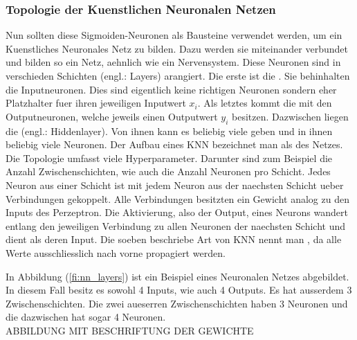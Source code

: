 \documentclass[../main]{subfiles}
\begin{document}
\subsubsection{Topologie der Kuenstlichen Neuronalen Netzen}
Nun sollten diese Sigmoiden-Neuronen als Bausteine verwendet werden, um ein Kuenstliches
Neuronales Netz zu bilden. Dazu werden sie miteinander verbundet und bilden so ein Netz,
aehnlich wie ein Nervensystem.
Diese Neuronen sind in verschieden Schichten (engl.: Layers)
arangiert. Die erste ist die . Sie behinhalten die
Inputneuronen. Dies sind eigentlich keine richtigen
Neuronen sondern eher Platzhalter fuer ihren jeweiligen Inputwert $x_i$. Als letztes kommt die
 mit den Outputneuronen, welche jeweils einen Outputwert $y_i$
besitzen. Dazwischen liegen die  (engl.: Hiddenlayer). Von ihnen kann es
beliebig viele geben und in ihnen beliebig viele Neuronen.
Der Aufbau eines KNN bezeichnet man als  des Netzes. Die
Topologie umfasst viele Hyperparameter. Darunter sind zum Beispiel die Anzahl Zwischenschichten, wie auch
die Anzahl Neuronen pro Schicht.
\para{}
Jedes Neuron aus einer Schicht ist mit jedem Neuron aus der naechsten Schicht ueber
Verbindungen gekoppelt. Alle Verbindungen besitzten ein Gewicht analog zu den Inputs des
Perzeptron. Die Aktivierung, also der Output, eines Neurons wandert entlang den jeweiligen
Verbindung zu allen Neuronen der naechsten Schicht und dient als deren Input.
Die soeben beschriebe Art von KNN nennt man , da alle Werte
ausschliesslich nach vorne propagiert werden.

In Abbildung (\ref{fi:nn_layers}) ist ein Beispiel eines Neuronalen Netzes
abgebildet. In diesem Fall besitz es sowohl 4 Inputs, wie auch 4 Outputs. Es hat
ausserdem 3 Zwischenschichten. Die zwei aueserren Zwischenschichten haben 3 Neuronen und die dazwischen
hat sogar 4 Neuronen.
\\ABBILDUNG MIT BESCHRIFTUNG DER GEWICHTE
\end{document}
